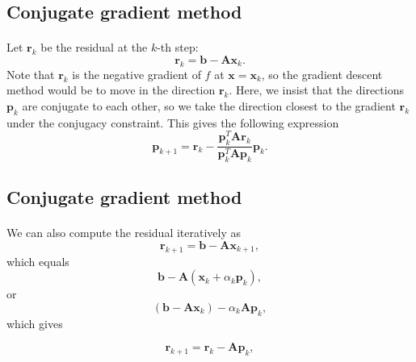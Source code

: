 \documentclass[%
oneside,                 %
final,                   %
10pt]{article}
\begin{document}
\subsection{Conjugate gradient method}

\paragraph{}
Let  $\bm{r}_k$ be the residual at the $k$-th step:
\begin{equation*}
\bm{r}_k=\bm{b}-\bm{A}\bm{x}_k.
\end{equation*}
Note that $\bm{r}_k$ is the negative gradient of $f$ at 
$\bm{x}=\bm{x}_k$, 
so the gradient descent method would be to move in the direction $\bm{r}_k$. 
Here, we insist that the directions $\bm{p}_k$ are conjugate to each other, 
so we take the direction closest to the gradient $\bm{r}_k$  
under the conjugacy constraint. 
This gives the following expression
\begin{equation*}
\bm{p}_{k+1}=\bm{r}_k-\frac{\bm{p}_k^T \bm{A}\bm{r}_k}{\bm{p}_k^T\bm{A}\bm{p}_k} \bm{p}_k.
\end{equation*}



\subsection{Conjugate gradient method}

\paragraph{}
We can also  compute the residual iteratively as
\begin{equation*}
\bm{r}_{k+1}=\bm{b}-\bm{A}\bm{x}_{k+1},
 \end{equation*}
which equals
\begin{equation*}
\bm{b}-\bm{A}(\bm{x}_k+\alpha_k\bm{p}_k),
 \end{equation*}
or
\begin{equation*}
(\bm{b}-\bm{A}\bm{x}_k)-\alpha_k\bm{A}\bm{p}_k,
 \end{equation*}
which gives

\begin{equation*}
\bm{r}_{k+1}=\bm{r}_k-\bm{A}\bm{p}_{k},
 \end{equation*}
\end{document}
